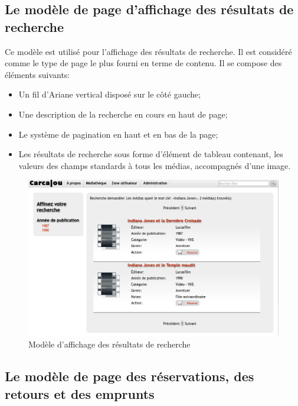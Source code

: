 \documentclass[letter, 11pt]{report}
\begin{document}
\subsection{Le modèle de page d'affichage des résultats de recherche}

Ce modèle est utilisé pour l'affichage des résultats de recherche. Il est considéré comme le type de page le plus fourni en terme de contenu. Il se compose des éléments suivants:

\begin{itemize}
	\item Un fil d'Ariane vertical disposé sur le côté gauche;
	\item Une description de la recherche en cours en haut de page;
	\item Le système de pagination en haut et en bas de la page;
	\item Les résultats de recherche sous forme d'élément de tableau contenant, les valeurs des champs standards à tous les médias, accompagnés d'une image.
\end{itemize}

\begin{figure}[htbp]
	\begin{center}
		\includegraphics[scale=0.4]{captures_ecran/modele_resultats_recherche.png}
	\end{center}
	\caption{Modèle d'affichage des résultats de recherche}
\end{figure}

\subsection{Le modèle de page des réservations, des retours et des emprunts}
\end{document}
